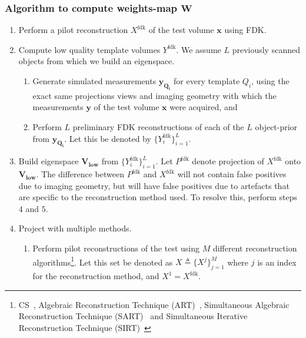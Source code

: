 \documentclass[journal]{IEEEtran}
\begin{document}
\subsubsection{\textbf{Algorithm to compute weights-map $\boldsymbol{W}$}}
\label{sec:thealgo}
\begin{enumerate}

\item Perform a pilot reconstruction $X^{\text{fdk}}$ of the
  test volume $\boldsymbol{x}$ using FDK.

\item Compute low quality template volumes $Y^\text{fdk}$. 
We assume $L$ previously scanned objects from which we build
an eigenspace. 
\vspace{-0.1cm}

\begin{enumerate}
  \item Generate simulated measurements $\boldsymbol{y_{Q_i}}$ for
    every template $Q_i$, using the exact same projections views and
    imaging geometry with which the measurements $\boldsymbol{y}$ of
    the test volume $\boldsymbol{x}$ were acquired, and
\item Perform $L$ preliminary FDK reconstructions of each of the $L$
  object-prior from $\boldsymbol{y_{Q_i}}$.  Let this be denoted by
  $\{Y^{\text{fdk}}_i\}_{i=1}^L$.
  \end{enumerate}
\item Build eigenspace $\boldsymbol{V_{\text{low}}}$ from
  $\{Y^{\text{fdk}}_i\}_{i=1}^L$.  Let $P^{\text{fdk}}$ denote
  projection of $X^{\text{fdk}}$ onto
  $\boldsymbol{V_{\text{low}}}$. The difference between
  $P^{\text{fdk}}$ and $X^{\text{fdk}}$ will not contain false
  positives due to imaging geometry, but will have false positives due
  to artefacts that are specific to the reconstruction method used. To
  resolve this, perform steps $4$ and $5$.
\item Project with multiple methods.
  \begin{enumerate}
  \item Perform pilot reconstructions of the test using $M$ different
    reconstruction algorithms\footnote{CS~\cite{lasso}, Algebraic Reconstruction Technique (ART)~\cite{art},
     Simultaneous Algebraic Reconstruction Technique (SART)~\cite{sart} and  Simultaneous Iterative Reconstruction Technique (SIRT)~\cite{sirt}}. Let this set be denoted
    as $X \triangleq \{X^j\}_{j=1}^M$ where $j$ is an index for the
    reconstruction method, and $X^1 = X^{\text{fdk}}$. 


\end{enumerate}
\end{enumerate}
\end{document}
